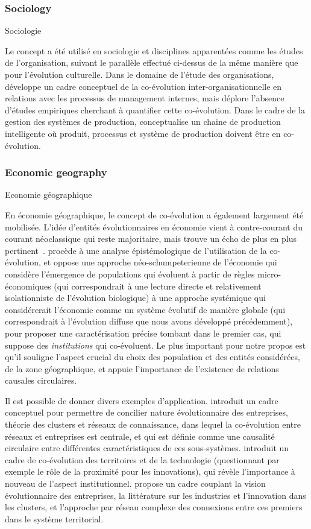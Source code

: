 \subsubsection{Sociology}{Sociologie}

Le concept a été utilisé en sociologie et disciplines apparentées comme les études de l'organisation, suivant le parallèle effectué ci-dessus de la même manière que pour l'évolution culturelle. Dans le domaine de l'étude des organisations, \cite{volberda2003co} développe un cadre conceptuel de la co-évolution inter-organisationnelle en relations avec les processus de management internes, mais déplore l'absence d'études empiriques cherchant à quantifier cette co-évolution. Dans le cadre de la gestion des systèmes de production, \cite{tolio2010species} conceptualise un chaine de production intelligente où produit, processus et système de production doivent être en co-évolution.


\subsubsection{Economic geography}{Economie géographique}


En économie géographique, le concept de co-évolution a également largement été mobilisée. L'idée d'entités évolutionnaires en économie vient à contre-courant du courant néoclassique qui reste majoritaire, mais trouve un écho de plus en plus pertinent~\cite{nelson2009evolutionary}. \cite{schamp201020} procède à une analyse épistémologique de l'utilisation de la co-évolution, et oppose une approche néo-schumpeterienne de l'économie qui considère l'émergence de populations qui évoluent à partir de règles micro-économiques (qui correspondrait à une lecture directe et relativement isolationniste de l'évolution biologique) à une approche systémique qui considérerait l'économie comme un système évolutif de manière globale (qui correspondrait à l'évolution diffuse que nous avons développé précédemment), pour proposer une caractérisation précise tombant dans le premier cas, qui suppose des \emph{institutions} qui co-évoluent. Le plus important pour notre propos est qu'il souligne l'aspect crucial du choix des population et des entités considérées, de la zone géographique, et appuie l'importance de l'existence de relations causales circulaires.

Il est possible de donner divers exemples d'application. \cite{doi:10.1080/00343400802662658} introduit un cadre conceptuel pour permettre de concilier nature évolutionnaire des entreprises, théorie des clusters et réseaux de connaissance, dans lequel la co-évolution entre réseaux et entreprises est centrale, et qui est définie comme une causalité circulaire entre différentes caractéristiques de ces sous-systèmes. \cite{colletis2010co} introduit un cadre de co-évolution des territoires et de la technologie (questionnant par exemple le rôle de la proximité pour les innovations), qui révèle l'importance à nouveau de l'aspect institutionnel. \cite{ter2011co} propose un cadre couplant la vision évolutionnaire des entreprises, la littérature sur les industries et l'innovation dans les clusters, et l'approche par réseau complexe des connexions entre ces premiers dans le système territorial.

